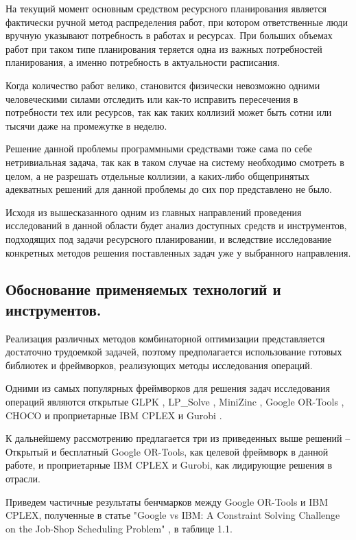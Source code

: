 На текущий момент основным средством ресурсного планирования является фактически ручной метод распределения работ, при котором ответственные люди вручную указывают потребность в работах и ресурсах. При больших объемах работ при таком типе планирования теряется одна из важных потребностей планирования, а именно потребность в актуальности расписания.

Когда количество работ велико, становится физически невозможно одними человеческими силами отследить или как-то исправить пересечения в потребности тех или ресурсов, так как таких коллизий может быть сотни или тысячи даже на промежутке в неделю.

Решение данной проблемы программными средствами тоже сама по себе нетривиальная задача, так как в таком случае на систему необходимо смотреть в целом, а не разрешать отдельные коллизии, а каких-либо общепринятых адекватных решений для данной проблемы до сих пор представлено не было.

Исходя из вышесказанного одним из главных направлений проведения исследований в данной области будет анализ доступных средств и инструментов, подходящих под задачи ресурсного планировании, и вследствие исследование конкретных методов решения поставленных задач уже у выбранного направления.

\subsection{Обоснование применяемых технологий и инструментов.}
Реализация различных методов комбинаторной оптимизации представляется достаточно трудоемкой задачей, поэтому предполагается использование готовых библиотек и фреймворков, реализующих методы исследования операций.

Одними из самых популярных фреймворков для решения задач исследования операций являются открытые GLPK \cite{glpk}, LP\_Solve \cite{lpsolve}, MiniZinc \cite{minizinc}, Google OR-Tools \cite{ortools}, CHOCO \cite{choco} и проприетарные IBM CPLEX \cite{cplex} и Gurobi \cite{gurobi}.

К дальнейшему рассмотрению предлагается три из приведенных выше решений -- Открытый и бесплатный Google OR-Tools, как целевой фреймворк в данной работе, и проприетарные IBM CPLEX и Gurobi, как лидирующие решения в отрасли.

Приведем частичные результаты бенчмарков между Google OR-Tools и IBM CPLEX, полученные в статье "Google vs IBM: A Constraint Solving Challenge on the Job-Shop Scheduling Problem" \cite{orvsplex}, в таблице 1.1.

